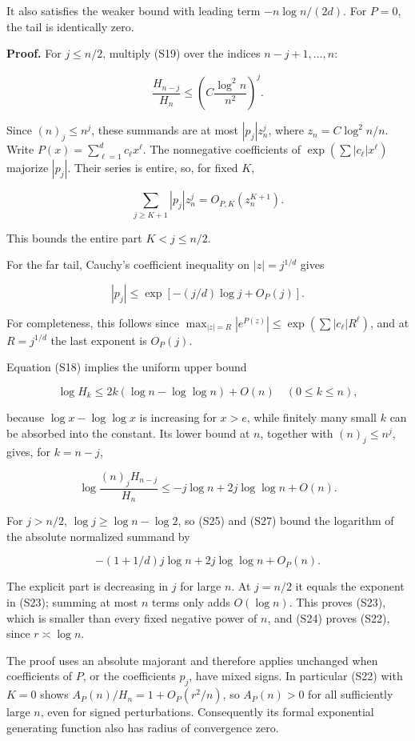 It also satisfies the weaker bound with leading term \(-n\log n/(2d)\).
For \(P=0\), the tail is identically zero.

\textbf{Proof.} For \(j\le n/2\), multiply (S19) over the indices
\(n-j+1,\ldots,n\):

\[
 \frac{H_{n-j}}{H_n}\le\left(C\frac{\log^2n}{n^2}\right)^j.
\]

Since \((n)_j\le n^j\), these summands are at most \(|p_j|z_n^j\), where
\(z_n=C\log^2n/n\). Write \(P(x)=\sum_{\ell=1}^dc_\ell x^\ell\). The
nonnegative coefficients of \(\exp(\sum |c_\ell|x^\ell)\) majorize
\(|p_j|\). Their series is entire, so, for fixed \(K\),

\[
 \sum_{j\ge K+1}|p_j|z_n^j=O_{P,K}(z_n^{K+1}). \tag{S24}
\]

This bounds the entire part \(K<j\le n/2\).

For the far tail, Cauchy's coefficient inequality on \(|z|=j^{1/d}\)
gives

\[
 |p_j|\le\exp\left[-(j/d)\log j+O_P(j)\right]. \tag{S25}
\]

For completeness, this follows since
\(\max_{|z|=R}|e^{P(z)}|\le\exp(\sum|c_\ell|R^\ell)\), and at
\(R=j^{1/d}\) the last exponent is \(O_P(j)\).

Equation (S18) implies the uniform upper bound

\[
 \log H_k\le2k(\log n-\log\log n)+O(n)\quad(0\le k\le n), \tag{S26}
\]

because \(\log x-\log\log x\) is increasing for \(x>e\), while finitely
many small \(k\) can be absorbed into the constant. Its lower bound at
\(n\), together with \((n)_j\le n^j\), gives, for \(k=n-j\),

\[
 \log\frac{(n)_jH_{n-j}}{H_n}
 \le-j\log n+2j\log\log n+O(n). \tag{S27}
\]

For \(j>n/2\), \(\log j\ge\log n-\log2\), so (S25) and (S27) bound the
logarithm of the absolute normalized summand by

\[
 -(1+1/d)j\log n+2j\log\log n+O_P(n).
\]

The explicit part is decreasing in \(j\) for large \(n\). At \(j=n/2\)
it equals the exponent in (S23); summing at most \(n\) terms only adds
\(O(\log n)\). This proves (S23), which is smaller than every fixed
negative power of \(n\), and (S24) proves (S22), since
\(r\asymp\log n\).

The proof uses an absolute majorant and therefore applies unchanged when
coefficients of \(P\), or the coefficients \(p_j\), have mixed signs. In
particular (S22) with \(K=0\) shows \(A_P(n)/H_n=1+O_P(r^2/n)\), so
\(A_P(n)>0\) for all sufficiently large \(n\), even for signed
perturbations. Consequently its formal exponential generating function
also has radius of convergence zero.

